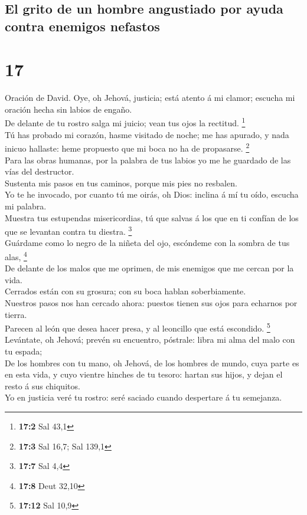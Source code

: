 \hypertarget{el-grito-de-un-hombre-angustiado-por-ayuda-contra-enemigos-nefastos}{%
\subsection{El grito de un hombre angustiado por ayuda contra enemigos
nefastos}\label{el-grito-de-un-hombre-angustiado-por-ayuda-contra-enemigos-nefastos}}

\hypertarget{section-16}{%
\section{17}\label{section-16}}

 Oración de David. Oye, oh Jehová, justicia; está atento á
mi clamor; escucha mi oración hecha sin labios de engaño.\\
 De delante de tu rostro salga mi juicio; vean tus ojos la
rectitud. \footnote{\textbf{17:2} Sal 43,1}\\
 Tú has probado mi corazón, hasme visitado de noche; me has
apurado, y nada inicuo hallaste: heme propuesto que mi boca no ha de
propasarse. \footnote{\textbf{17:3} Sal 16,7; Sal 139,1}\\
 Para las obras humanas, por la palabra de tus labios yo me
he guardado de las vías del destructor.\\
 Sustenta mis pasos en tus caminos, porque mis pies no
resbalen.\\
 Yo te he invocado, por cuanto tú me oirás, oh Dios: inclina
á mí tu oído, escucha mi palabra.\\
 Muestra tus estupendas misericordias, tú que salvas á los
que en ti confían de los que se levantan contra tu diestra.
\footnote{\textbf{17:7} Sal 4,4}\\
 Guárdame como lo negro de la niñeta del ojo, escóndeme con
la sombra de tus alas, \footnote{\textbf{17:8} Deut 32,10}\\
 De delante de los malos que me oprimen, de mis enemigos que
me cercan por la vida.\\
 Cerrados están con su grosura; con su boca hablan
soberbiamente.\\
 Nuestros pasos nos han cercado ahora: puestos tienen sus
ojos para echarnos por tierra.\\
 Parecen al león que desea hacer presa, y al leoncillo que
está escondido. \footnote{\textbf{17:12} Sal 10,9}\\
 Levántate, oh Jehová; prevén su encuentro, póstrale: libra
mi alma del malo con tu espada;\\
 De los hombres con tu mano, oh Jehová, de los hombres de
mundo, cuya parte es en esta vida, y cuyo vientre hinches de tu tesoro:
hartan sus hijos, y dejan el resto á sus chiquitos.\\
 Yo en justicia veré tu rostro: seré saciado cuando
despertare á tu semejanza.

